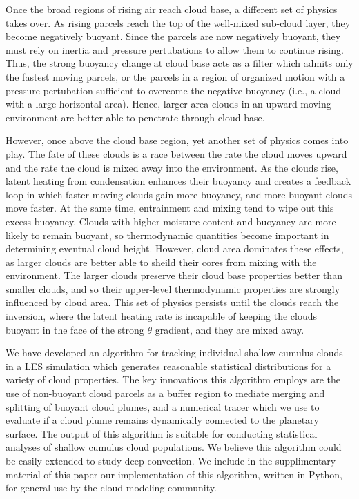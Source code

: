 \documentclass[acp]{copernicus}
\begin{document}
Once the broad regions of rising air reach cloud base, a different set of 
physics takes over.  As rising parcels reach the top of the well-mixed 
sub-cloud layer, they become negatively buoyant.  Since the parcels are now 
negatively buoyant, they must rely on inertia and pressure pertubations to 
allow them to continue rising.  Thus, the strong buoyancy change at cloud base 
acts as a filter which admits only the fastest moving parcels, or the parcels 
in a region of organized motion with a pressure pertubation sufficient to 
overcome the negative buoyancy (i.e., a cloud with a large horizontal area).  
Hence, larger area clouds in an upward moving environment are better able to
penetrate through cloud base.

However, once above the cloud base region, yet another set of physics comes 
into play.  The fate of these clouds is a race between the rate the cloud moves 
upward and the rate the cloud is mixed away into the environment.  As the 
clouds rise, latent heating from condensation enhances their buoyancy and 
creates a feedback loop in which faster moving clouds gain more buoyancy, and 
more buoyant clouds move faster.  At the same time, entrainment and mixing 
tend to wipe out this excess buoyancy.  Clouds with higher moisture content and 
buoyancy are more likely to remain buoyant, so thermodynamic quantities become 
important in determining eventual cloud height.  However, cloud area dominates 
these effects, as larger clouds are better able to sheild their cores from 
mixing with the environment.  The larger clouds preserve their cloud base 
properties better than smaller clouds, and so their upper-level thermodynamic 
properties are strongly influenced by cloud area.  This set of physics persists 
until the clouds reach the inversion, where the latent heating rate is 
incapable of keeping the clouds buoyant in the face of the strong $\theta$ 
gradient, and they are mixed away.


\conclusions
We have developed an algorithm for tracking individual shallow cumulus clouds 
in a LES simulation which generates reasonable statistical distributions for a 
variety of cloud properties.  The key innovations this algorithm employs are 
the use of non-buoyant cloud parcels as a buffer region to mediate merging and 
splitting of buoyant cloud plumes, and a numerical tracer which we use to 
evaluate if a cloud plume remains dynamically connected to the planetary 
surface.  The output of this algorithm is suitable for conducting statistical 
analyses of shallow cumulus cloud populations.  We believe this algorithm could 
be easily extended to study deep convection.  We include in the supplimentary 
material of this paper our implementation of this algorithm, written in Python, 
for general use by the cloud modeling community.
\end{document}
